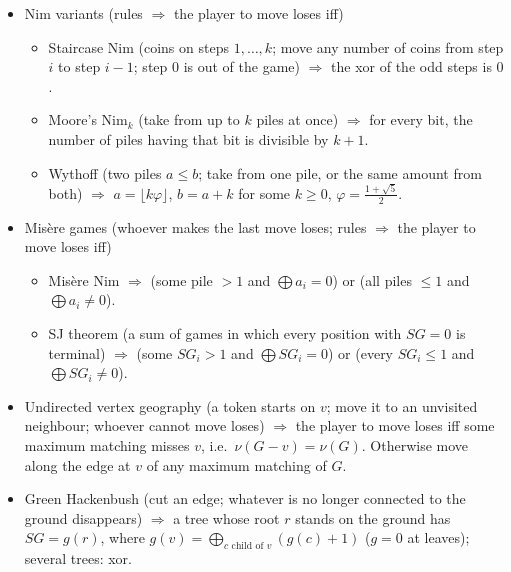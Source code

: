 \begin{itemize}
\item Nim variants (rules $\Rightarrow$ the player to move loses iff)
\begin{itemize}
  \item Staircase Nim (coins on steps $1, \ldots, k$; move any number of coins from step $i$ to step $i - 1$; step $0$ is out of the game) $\Rightarrow$ the xor of the odd steps is $0$.
  \item Moore's Nim$_k$ (take from up to $k$ piles at once) $\Rightarrow$ for every bit, the number of piles having that bit is divisible by $k + 1$.
  \item Wythoff (two piles $a \le b$; take from one pile, or the same amount from both) $\Rightarrow$ $a = \lfloor k\varphi \rfloor$, $b = a + k$ for some $k \ge 0$, $\varphi = \frac{1+\sqrt5}{2}$.
\end{itemize}

\item Misère games (whoever makes the last move loses; rules $\Rightarrow$ the player to move loses iff)
\begin{itemize}
  \item Misère Nim $\Rightarrow$ (some pile $> 1$ and $\bigoplus a_i = 0$) or (all piles $\le 1$ and $\bigoplus a_i \ne 0$).
  \item SJ theorem (a sum of games in which every position with $SG = 0$ is terminal) $\Rightarrow$ (some $SG_i > 1$ and $\bigoplus SG_i = 0$) or (every $SG_i \le 1$ and $\bigoplus SG_i \ne 0$).
\end{itemize}

\item Undirected vertex geography (a token starts on $v$; move it to an unvisited neighbour; whoever cannot move loses) $\Rightarrow$ the player to move loses iff some maximum matching misses $v$, i.e.\ $\nu(G - v) = \nu(G)$. Otherwise move along the edge at $v$ of any maximum matching of $G$.

\item Green Hackenbush (cut an edge; whatever is no longer connected to the ground disappears) $\Rightarrow$ a tree whose root $r$ stands on the ground has $SG = g(r)$, where $g(v) = \bigoplus_{c \text{ child of } v} (g(c) + 1)$ ($g = 0$ at leaves); several trees: xor.
\end{itemize}
